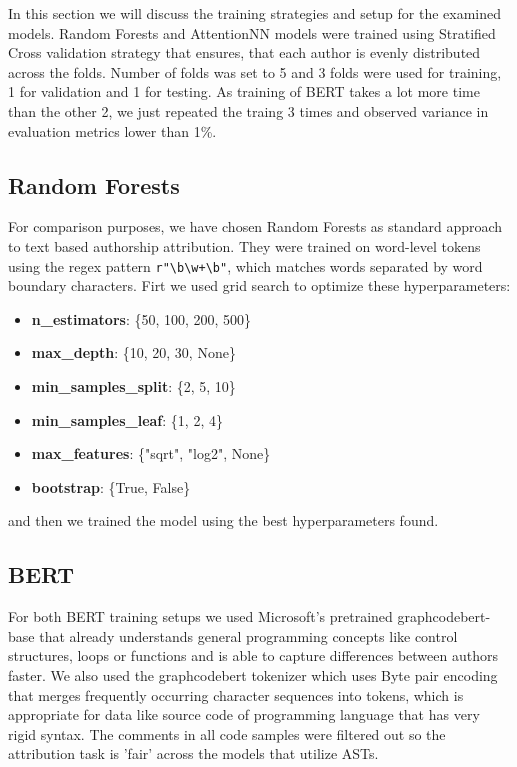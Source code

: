 \documentclass{article}
\begin{document}
In this section we will discuss the training strategies and setup for the examined models.
Random Forests and AttentionNN models were trained using Stratified Cross validation strategy that ensures, that each author is evenly distributed
across the folds. Number of folds was set to 5 and 3 folds were used for training, 1 for validation and 1 for testing.
As training of BERT takes a lot more time than the other 2, we just repeated the traing 3 times and 
observed variance in evaluation metrics lower than 1\%.

\subsection{Random Forests}

For comparison purposes, we have chosen Random Forests as standard approach to text based authorship attribution. 
They were trained on word-level tokens using the regex pattern \verb|r"\b\w+\b"|, which matches words separated by word boundary characters.
Firt we used grid search to optimize these hyperparameters:
\begin{itemize}
    \item \textbf{n\_estimators}: \{50, 100, 200, 500\}
    \item \textbf{max\_depth}: \{10, 20, 30, None\}
    \item \textbf{min\_samples\_split}: \{2, 5, 10\}
    \item \textbf{min\_samples\_leaf}: \{1, 2, 4\}
    \item \textbf{max\_features}: \{"sqrt", "log2", None\}
    \item \textbf{bootstrap}: \{True, False\}
\end{itemize}

and then we trained the model using the best hyperparameters found.

\subsection{BERT}

For both BERT training setups we used Microsoft's pretrained graphcodebert-base \cite{codebert} that already understands general programming concepts like 
control structures, loops or functions and is able to capture differences between authors faster. We also used the graphcodebert tokenizer which uses 
Byte pair encoding that merges frequently occurring character sequences into tokens, which is appropriate for data like source code of programming language
that has very rigid syntax. The comments in all code samples were filtered out so the attribution task
is 'fair' across the models that utilize ASTs.
\end{document}
